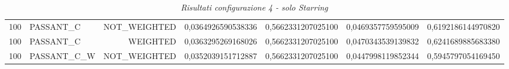\begin{table}[H]
{\begin{tabular}{ c l r c c c c }
	100 &  PASSANT\_C & NOT\_WEIGHTED & 0,0364926590538336 & 0,5662331207025100 & 0,0469357759595009 & 0,6192186144970820 \\
	
	100 &  PASSANT\_C &   WEIGHTED & 0,0363295269168026 & 0,5662331207025100 & 0,0470343539139832 & 0,6241689885683380 \\
	
	100 & PASSANT\_C\_W & NOT\_WEIGHTED & 0,0352039151712887 & 0,5662331207025100 & 0,0447998119852344 & 0,5945797054169450 \\
	
\bottomrule
\end{tabular}  
}
\caption{\emph{Risultati configurazione 4 - solo Starring}}
\end{table}   

\setlength{\tabcolsep}{12pt}
